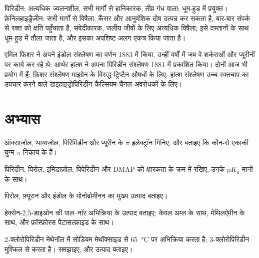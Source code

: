 \begin{safety}{}
पिरिडीन: अत्यधिक ज्वलनशील, सभी मार्गों से हानिकारक, तीव्र गंध वाला; धूम-हुड में
प्रयुक्त। फ़ेनिलहाइड्रैज़ीन: सभी मार्गों से विषैला, कैंसर और आनुवंशिक दोष उत्पन्न कर सकता है,
बार-बार संपर्क से रक्त को क्षति पहुँचाता है, संवेदीकारक, जलीय जीवों के लिए अत्यधिक
विषैला; इसे दस्तानों के साथ धूम-हुड में तौला जाता है, और इसका अपशिष्ट
अलग एकत्र किया जाता है।
\end{safety}

\begin{history}[दो क्लासिकी वलय-संश्लेषण]
एमिल फ़िशर ने अपने इंडोल संश्लेषण का वर्णन 1883 में किया, उन्हीं वर्षों में जब वे
शर्कराओं और प्यूरीनों पर कार्य कर रहे थे; आर्थर हांत्श ने अपना पिरिडीन
संश्लेषण 1881 में प्रकाशित किया। दोनों आज भी प्रयोग में हैं: फ़िशर संश्लेषण
माइग्रेन के विरुद्ध ट्रिप्टैन औषधों के लिए, हांत्श संश्लेषण उच्च रक्तचाप का उपचार करने
वाले डाइहाइड्रोपिरिडीन कैल्सियम-चैनल अवरोधकों के लिए।
\end{history}

\section{अभ्यास}

\begin{exercise}[$\star$]\label{exo:b3:heterocycles:1}
ऑक्साज़ोल, थायाज़ोल, पिरिमिडीन और प्यूरीन के $\pi$ इलेक्ट्रॉन गिनिए, और बताइए कि कौन-से
एकाकी युग्म $\pi$ निकाय के हैं।
\end{exercise}

\begin{exercise}[$\star$]\label{exo:b3:heterocycles:2}
पिरिडीन, पिरोल, इमिडाज़ोल, पिपेरिडीन और DMAP को क्षारकता के क्रम में रखिए, उनके
$\mathrm pK_a$ मानों के साथ।
\end{exercise}

\begin{exercise}[$\star$]\label{exo:b3:heterocycles:3}
पिरोल, फ़्यूरान और इंडोल के मोनोब्रोमीनन का मुख्य उत्पाद बताइए।
\end{exercise}

\begin{exercise}[$\star$]\label{exo:b3:heterocycles:4}
हेक्सेन-2,5-डाइओन की पाल--नॉर अभिक्रिया के उत्पाद बताइए: केवल अम्ल के साथ,
मेथिलऐमीन के साथ, और फ़ॉस्फ़ोरस पेंटासल्फ़ाइड के साथ।
\end{exercise}

\begin{exercise}[$\star\star$]\label{exo:b3:heterocycles:5}
2-क्लोरोपिरिडीन मेथेनॉल में सोडियम मेथॉक्साइड से \qty{65}{\celsius} पर अभिक्रिया करता है; 3-क्लोरोपिरिडीन
मुश्किल से करता है। समझाइए, और उत्पाद बताइए।
\end{exercise}

